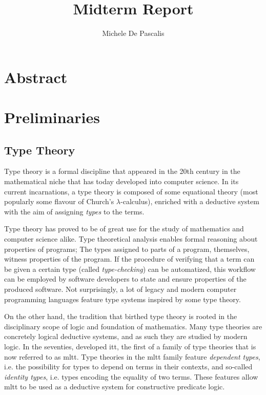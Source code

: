 \documentclass[a4paper]{article}
\author{Michele De Pascalis}
\title{Midterm Report}
\begin{document}
\maketitle

\section*{Abstract}


\section{Preliminaries}


\subsection{Type Theory}

Type theory is a formal discipline that appeared in the 20th century in the mathematical niche that has today developed into computer science. In its current incarnations, a type theory is composed of some equational theory (most popularly some flavour of Church's \(\lambda\)-calculus), enriched with a deductive system with the aim of assigning \textit{types} to the terms.

Type theory has proved to be of great use for the study of mathematics and computer science alike. Type theoretical analysis enables formal reasoning about properties of programs; The types assigned to parts of a program, themselves, witness properties of the program. If the procedure of verifying that a term can be given a certain type (called \textit{type-checking}) can be automatized, this workflow can be employed by software developers to state and ensure properties of the produced software. Not surprisingly, a lot of legacy and modern computer programming languages feature type systems inspired by some type theory.

On the other hand, the tradition that birthed type theory is rooted in the disciplinary scope of logic and foundation of mathematics. Many type theories are concretely logical deductive systems, and as such they are studied by modern logic. In the seventies, \textcite{MartinLoef1998} developed \gls{itt}, the first of a family of type theories that is now referred to as \gls{mltt}. Type theories in the \gls{mltt} family feature \textit{dependent types}, i.e. the possibility for types to depend on terms in their contexts, and so-called \textit{identity types}, i.e. types encoding the equality of two terms. These features allow \gls{mltt} to be used as a deductive system for constructive predicate logic.
\end{document}
